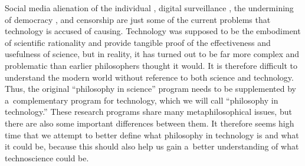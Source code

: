 Social media alienation of the individual 
\parencite[][]{reveley_understanding_2013}, %
 digital surveillance 
\parencites[][]{galic_bentham_2017}[][]{selinger_normalizing_2021}, %
 the undermining of democracy 
\parencite[][]{olaniran_social_2020}, %
 and censorship 
\parencite[][]{cobbe_algorithmic_2021} %
 are just some of the current problems that technology is accused of causing. Technology was supposed to be the embodiment of scientific rationality and provide tangible proof of the effectiveness and usefulness of science, but in reality, it has turned out to be far more complex and problematic than earlier philosophers thought it would. It is therefore difficult to understand the modern world without reference to both science and technology. Thus, the original ``philosophy in science'' program needs to be supplemented by a~complementary program for technology, which we will call ``philosophy in technology.'' These research programs share many metaphilosophical issues, but there are also some important differences between them. It therefore seems high time that we attempt to better define what philosophy in technology is and what it could be, because this should also help us gain a~better understanding of what technoscience could be.



